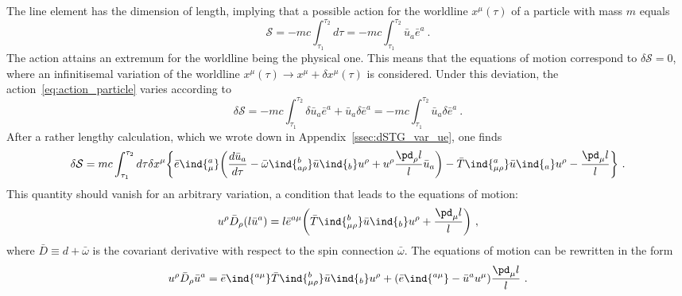 \documentclass[11pt]{article}
\begin{document}
The line element has the dimension of length, implying that a 
possible action for the worldline $x^\mu(\tau)$ of a particle 
with mass $m$ equals
\begin{equation}
	\label{eq:action_particle}
	\mathcal{S} = -mc \int_{\tau_1}^{\tau_2} d\tau
		= -mc \int_{\tau_1}^{\tau_2} \bar{u}_a \bar{e}^a~.
\end{equation}
The action attains an extremum for the worldline being the 
physical one. This means that the equations of motion correspond 
to $\delta \mathcal{S} = 0$, where an infinitisemal variation of 
the worldline $x^\mu(\tau) \to x^\mu + \delta x^\mu(\tau)$ is 
considered. Under this deviation, the 
action~\eqref{eq:action_particle} varies according to
\begin{displaymath}
	\delta\mathcal{S} = -mc \int_{\tau_1}^{\tau_2} \delta\bar{u}_a 
	\bar{e}^a + \bar{u}_a \delta\bar{e}^a
	= -mc \int_{\tau_1}^{\tau_2} \bar{u}_a \delta\bar{e}^a~.
\end{displaymath}
After a rather lengthy calculation, which we wrote down in 
Appendix~\eqref{ssec:dSTG_var_ue}, one finds
\begin{displaymath}
	\delta\mathcal{S} = mc \int_{\tau_1}^{\tau_2} d\tau \delta 
	x^\mu \bigg\{ \bar{e}\ind{^a_\mu} \bigg( 
	\frac{d\bar{u}_a}{d\tau} - \bar{\omega}\ind{^b_{a\rho}} 
	\bar{u}\ind{_b} u^\rho + u^\rho \frac{\pd_\rho l}{l} \bar{u}_a 
	\bigg) - \bar{T}\ind{^a_{\mu\rho}} \bar{u}\ind{_a} u^\rho - 
	\frac{\pd_\mu l}{l} \bigg\}~.
\end{displaymath}
This quantity should vanish for an arbitrary variation, a 
condition that leads to the equations of motion:
\begin{displaymath}
	u^\rho \bar{D}_\rho (l \bar{u}^a) = l\bar{e}^{a\mu} 
	\bigg(\bar{T}\ind{^b_{\mu\rho}} \bar{u}\ind{_b} u^\rho + 
	\frac{\pd_\mu l}{l} \bigg)~,
\end{displaymath}
where $\bar{D} \equiv d + \bar{\omega}$ is the covariant 
derivative with respect to the spin connection $\bar{\omega}$.
The equations of motion can be rewritten in the form
\begin{equation}
	\label{eq:eom_particle_dSTG}
	u^\rho \bar{D}_\rho \bar{u}^a = \bar{e}\ind{^{a\mu}} 
	\bar{T}\ind{^b_{\mu\rho}} \bar{u}\ind{_b} u^\rho + 
	(\bar{e}\ind{^{a\mu}} - \bar{u}^a u^\mu) \frac{\pd_\mu l}{l}~.
\end{equation}
\end{document}
